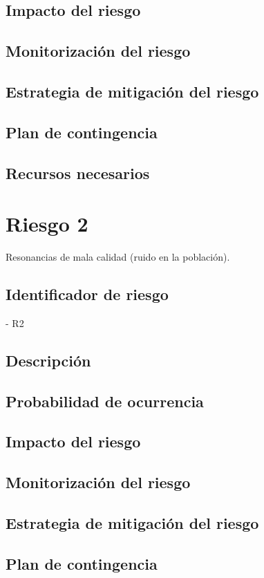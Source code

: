 \subsection{Impacto del riesgo}
\subsection{Monitorización del riesgo}
\subsection{Estrategia de mitigación del riesgo}
\subsection{Plan de contingencia}
\subsection{Recursos necesarios}

\section{Riesgo 2}

Resonancias de mala calidad (ruido en la población).

\subsection{Identificador de riesgo}
- R2
\subsection{Descripción}
\subsection{Probabilidad de ocurrencia}
\subsection{Impacto del riesgo}
\subsection{Monitorización del riesgo}
\subsection{Estrategia de mitigación del riesgo}
\subsection{Plan de contingencia}

